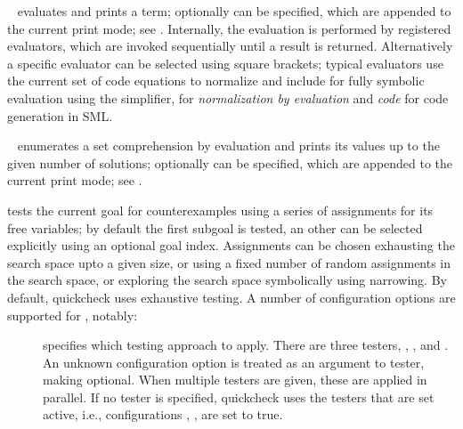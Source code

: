 \begin{isabellebody}
\begin{isamarkuptext}
  \begin{description}

  \item \hyperlink{command.HOL.value}{\mbox{}}~ evaluates and prints a
  term; optionally  can be specified, which are appended
  to the current print mode; see .
  Internally, the evaluation is performed by registered evaluators,
  which are invoked sequentially until a result is returned.
  Alternatively a specific evaluator can be selected using square
  brackets; typical evaluators use the current set of code equations
  to normalize and include  for fully symbolic evaluation
  using the simplifier,  for \emph{normalization by
  evaluation} and \emph{code} for code generation in SML.

  \item \hyperlink{command.HOL.values}{\mbox{}}~ enumerates a set
  comprehension by evaluation and prints its values up to the given
  number of solutions; optionally  can be specified,
  which are appended to the current print mode; see
  .

  \item \hyperlink{command.HOL.quickcheck}{\mbox{}} tests the current goal for
  counterexamples using a series of assignments for its free
  variables; by default the first subgoal is tested, an other can be
  selected explicitly using an optional goal index.  Assignments can
  be chosen exhausting the search space upto a given size, or using a
  fixed number of random assignments in the search space, or exploring
  the search space symbolically using narrowing.  By default,
  quickcheck uses exhaustive testing.  A number of configuration
  options are supported for \hyperlink{command.HOL.quickcheck}{\mbox{}}, notably:

    \begin{description}

    \item[] specifies which testing approach to apply.
    There are three testers, , , and
    .  An unknown configuration option is treated as
    an argument to tester, making  optional.  When
    multiple testers are given, these are applied in parallel.  If no
    tester is specified, quickcheck uses the testers that are set
    active, i.e., configurations \hyperlink{attribute.quickcheck-exhaustive-active}{\mbox{}}, \hyperlink{attribute.quickcheck-random-active}{\mbox{}}, \hyperlink{attribute.quickcheck-narrowing-active}{\mbox{}} are set to true.


\end{description}
\end{description}
\end{isamarkuptext}
\end{isabellebody}
